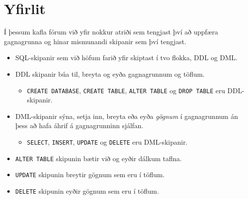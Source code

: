 \section{Yfirlit}
Í þessum kafla fórum við yfir nokkur atriði sem tengjast því að uppfæra gagnagrunna og hinar mismunandi skipanir sem því tengjast.
\begin{itemize}
 \item SQL-skipanir sem við höfum farið yfir skiptast í tvo flokka, DDL og DML.
 \item DDL skipanir búa til, breyta og eyða gagnagrunnum og töflum.
 \begin{itemize}
  \item \verb|CREATE DATABASE|, \verb|CREATE TABLE|, \verb|ALTER TABLE| og \verb|DROP TABLE| eru DDL-skipanir.
 \end{itemize}
 \item DML-skipanir sýna, setja inn, breyta eða eyða \emph{gögnum} í gagnagrunnum án þess að hafa áhrif á gagnagrunninn sjálfan.
 \begin{itemize}
  \item \verb|SELECT|, \verb|INSERT|, \verb|UPDATE| og \verb|DELETE| eru DML-skipanir.
 \end{itemize}
 \item \verb|ALTER TABLE| skipunin bætir við og eyðir dálkum taflna.
 \item \verb|UPDATE| skipunin breytir gögnum sem eru í töflum.
 \item \verb|DELETE| skipunin eyðir gögnum sem eru í töflum.
\end{itemize}
